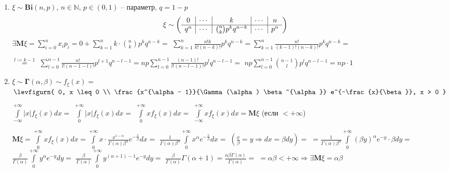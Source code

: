 \begin{example}
  \begin{enumerate}
    \item
    $\xi \sim \boldsymbol{Bi}(n,p)$, $n \in \mathbb{N}$, $p \in (0,1)$ -- параметр, $q=1-p$
    \[ \xi \sim \left( \begin{array}{ccccc}
      0 & \multicolumn{1}{|c}{\cdots} & \multicolumn{1}{|c}{k} & \multicolumn{1}{|c}{\cdots} & \multicolumn{1}{|c}{n}\\ \hline
      q^{n} & \multicolumn{1}{|c}{\cdots} & \multicolumn{1}{|c}{\binom{n}{k}p^{k}q^{n-k}} & \multicolumn{1}{|c}{\cdots} & \multicolumn{1}{|c}{p^{n}}\\
    \end{array} \right) \]
    $\exists \mathbf{M}\xi = \sum\limits_{i=0}^{n} x_i p_i = 0 + \sum\limits_{k=1}^{n}k \cdot \binom{n}{k}p^{k}q^{n-k} = $
    $\sum\limits_{k=1}^{n} \frac{n!k}{k!(n-k)!} p^{k}q^{n-k} = \sum\limits_{k=1}^{n}\frac{n!}{(k-1)!(n-k)!}p^{k}q^{n-k} = $

    $\stackrel{l:=k-1}{=} $
    $\sum\limits_{l=0}^{n-1}\frac{n!}{l!(n-1-l)!}p^{l+1}q^{n-l-1} = np\sum\limits_{l=0}^{n-1}\frac{(n-1)!}{l!(n-l-1)!}p^{l}q^{n-l-1} = $
    $np\sum\limits_{l=0}^{n-1}\binom{n-1}{l}p^{l}q^{n-l-1} = np \cdot 1$
    \item
    $\xi \sim \boldsymbol{\Gamma}(\alpha,\beta) \sim f_{\xi}(x) = $
    $\levfigurn
    {
      0, x \leq 0 \\
      \frac{x^{\alpha - 1}}{\Gamma(\alpha) \beta^{\alpha}} e^{-\frac{x}{\beta}}, x > 0
    }$

    $\int\limits_{-\infty}^{+\infty}|x| f_{\xi}(x)dx = $
    $\int\limits_{0}^{+\infty}|x| f_{\xi}(x)dx =$
    $\int\limits_{0}^{+\infty}x f_{\xi}(x)dx = $
    $\int\limits_{-\infty}^{+\infty}x f_{\xi}(x)dx = \mathbf{M}\xi$ (если $< +\infty$)

    $\mathbf{M}\xi = \int\limits_{0}^{+\infty}x f_{\xi}(x)dx = \int\limits_{0}^{+\infty}x \cdot \frac{x^{1-\alpha}}{\Gamma(\alpha) \beta^{\alpha}} e^{-\frac{x}{\beta}} dx = $
    $\frac{1}{\Gamma(\alpha)\beta^{\alpha}} \int\limits_{0}^{+\infty}x^{\alpha} e^{-\frac{x}{\beta}}dx = $
    $(\frac{x}{\beta} = y \Rightarrow dx = \beta dy) =$
    $= \frac{1}{\Gamma(\alpha)\beta^{\alpha}} \int\limits_{0}^{+\infty}(\beta y)^{\alpha} e^{-y} \cdot \beta dy = $
    $\frac{\beta}{\Gamma(\alpha)} \int\limits_{0}^{+\infty} y^{\alpha} e^{-y} dy =$
    $\frac{\beta}{\Gamma(\alpha)} \int\limits_{0}^{+\infty} y^{(\alpha + 1) -1} e^{-y} dy =$
    $\frac{\beta}{\Gamma(\alpha)} \Gamma(\alpha + 1) = \frac{\alpha \beta \Gamma(\alpha)}{\Gamma(\alpha)} =$
    $= \alpha\beta < +\infty \Rightarrow \exists\mathbf{M}\xi = \alpha\beta$
  \end{enumerate}
\end{example}

